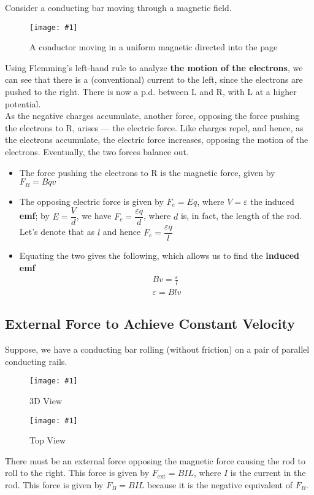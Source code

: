 \documentclass[a4paper,12pt]{article}
\newcommand{\lb}{\\[8pt]}
\newcommand{\img}[4]{\begin{center}
  \begin{figure}[H]
    \centering
    \texttt{[image: \#1]}
    \caption{#3}
    \label{fig:#4}
  \end{figure}
\end{center}}
\begin{document}
Consider a conducting bar moving through a magnetic field.
\img{bar.png}{0.6}{A conductor moving in a uniform magnetic directed into the page}{bar}
Using Flemming's left-hand rule to analyze \textbf{the motion of the electrons}, we can see that there is a (conventional) current to the left, since the electrons are pushed to the right. There is now a p.d. between L and R, with L at a higher potential.\lb
As the negative charges accumulate, another force, opposing the force pushing the electrons to R, arises --- the electric force. Like charges repel, and hence, as the electrons accumulate, the electric force increases, opposing the motion of the electrons. Eventually, the two forces balance out.
\begin{itemize}
  \item The force pushing the electrons to R is the magnetic force, given by $F_B = Bqv$
  \item The opposing electric force is given by $F_e = Eq$, where $V = \varepsilon$ the induced \textbf{emf}; by $E = \dfrac{V}{d}$, we have $F_e = \dfrac{\varepsilon q}{d}$, where $d$ is, in fact, the length of the rod. Let's denote that as $l$ and hence $F_e = \dfrac{\varepsilon q}{l}$
  \item Equating the two gives the following, which allows us to find the \textbf{induced emf}
        \begin{align*}
          Bv = \frac{\varepsilon}{l} \\
          \varepsilon = Blv
        \end{align*}
\end{itemize}


\subsection{External Force to Achieve Constant Velocity}

Suppose, we have a conducting bar rolling (without friction) on a pair of parallel conducting rails.

\begin{minipage}{0.5\textwidth}
  \img{rolling1.png}{1}{3D View}{rollingbar1}
\end{minipage}%
\begin{minipage}{0.5\textwidth}
  \img{rolling2.png}{1}{Top View}{rollingbar2}
\end{minipage}

There must be an external force opposing the magnetic force causing the rod to roll to the right. This force is given by $F_{\text{ext}} = BIL$, where $I$ is the current in the rod. This force is given by $F_B=BIL$ because it is the negative equivalent of $F_B$.
\end{document}
